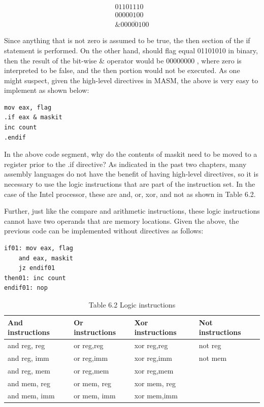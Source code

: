 \documentclass[10pt]{book}
\begin{document}
$$
\begin{array}{r}
01101110 \\
00000100 \\
\& \overline{00000100}
\end{array}
$$

Since anything that is not zero is assumed to be true, the then section of the if statement is performed. On the other hand, should flag equal 01101010 in binary, then the result of the bit-wise \& operator would be 00000000 , where zero is interpreted to be false, and the then portion would not be executed. As one might suspect, given the high-level directives in MASM, the above is very easy to implement as shown below:


\begin{verbatim}
mov eax, flag
.if eax & maskit
inc count
.endif
\end{verbatim}

In the above code segment, why do the contents of maskit need to be moved to a register prior to the .if directive? As indicated in the past two chapters, many assembly languages do not have the benefit of having high-level directives, so it is necessary to use the logic instructions that are part of the instruction set. In the case of the Intel processor, these are and, or, xor, and not as shown in Table 6.2.

Further, just like the compare and arithmetic instructions, these logic instructions cannot have two operands that are memory locations. Given the above, the previous code can be implemented without directives as follows:

\begin{verbatim}
if01: mov eax, flag
    and eax, maskit
    jz endif01
then01: inc count
endif01: nop
\end{verbatim}

\begin{table}[htbp]
\begin{center}
\captionsetup{labelformat=empty}
\caption{Table 6.2 Logic instructions}
\begin{tabular}{|l|l|l|l|}
\hline
And instructions & Or instructions & Xor instructions & Not instructions \\
\hline
and reg, reg & or reg,reg & xor reg,reg & not reg \\
\hline
and reg, imm & or reg,imm & xor reg,imm & not mem \\
\hline
and reg, mem & or reg,mem & xor reg,mem &  \\
\hline
and mem, reg & or mem, reg & xor mem, reg &  \\
\hline
and mem, imm & or mem, imm & xor mem,imm &  \\
\hline
\end{tabular}
\end{center}
\end{table}
\end{document}
